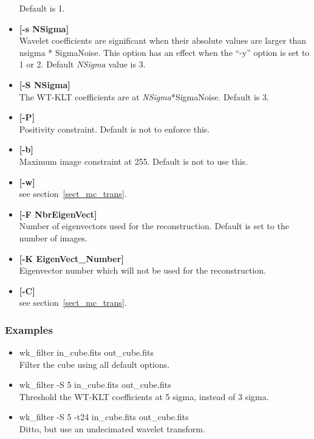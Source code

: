 \begin{itemize}
{} 
Default is 1.     
\item {\bf [-s NSigma]} \\
Wavelet coefficients are significant when their absolute values are larger
than nsigma * SigmaNoise. This option has an effect when 
the ``-y'' option is set to 1 or 2.
Default {\em NSigma} value is  3. 
\item {\bf [-S NSigma]} \\
The WT-KLT coefficients are  at {\em NSigma}*SigmaNoise.
Default is  3.
\item {\bf [-P]}\\
Positivity constraint. Default is not to enforce this.
\item {\bf [-b]}\\
Maximum image constraint at 255.  Default is not to use this.
\item {\bf [-w]}\\
see section~\ref{sect_mc_trans}.  
\item {\bf [-F NbrEigenVect]} \\
Number of eigenvectors used for the reconstruction. 
Default is set to the number of images.
\item {\bf [-K EigenVect\_Number]} \\
Eigenvector number which will not be used for the reconstruction. 
\item {\bf [-C]}\\
see section~\ref{sect_mc_trans}.  
\end{itemize}
\subsubsection*{Examples}
\begin{itemize}
\baselineskip=0.4truecm
\itemsep=0.1truecm
\item wk\_filter in\_cube.fits out\_cube.fits \\
Filter the cube using all default options.
\item wk\_filter -S 5 in\_cube.fits out\_cube.fits\\
Threshold the WT-KLT coefficients at 5 sigma, instead of 3 sigma.
\item wk\_filter -S 5 -t24 in\_cube.fits out\_cube.fits\\
Ditto, but use an undecimated wavelet transform.
\end{itemize}

